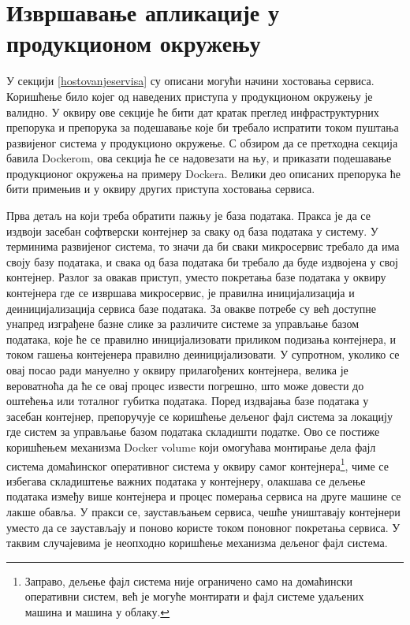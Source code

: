 \documentclass[12pt,oneside]{memoir}
\begin{document}
\section{Извршавање апликације у продукционом окружењу}
У секцији \ref{hostovanjeservisa} су описани могући начини хостовања сервиса. Коришћење било којег од наведених приступа у продукционом окружењу је валидно. У оквиру ове секције ће бити дат кратак преглед инфраструктурних препорука и препорука за подешавање које би требало испратити током пуштања развијеног система у продукционо окружење. С обзиром да се претходна секција бавила Dockerom, ова секција ће се надовезати на њу, и приказати подешавање продукционог окружења на примеру Dockera. Велики део описаних препорука ће бити примењив и у оквиру других приступа хостовања сервиса.

Прва детаљ на који треба обратити пажњу је база података. Пракса је да се издвоји засебан софтверски контејнер за сваку од база података у систему. У терминима развијеног система, то значи да би сваки микросервис требало да има своју базу података, и свака од база података би требало да буде издвојена у свој контејнер. Разлог за овакав приступ, уместо покретања базе података у оквиру контејнера где се извршава микросервис, је правилна иницијализација и деиницијализација сервиса базе података. За овакве потребе су већ доступне унапред изграђене базне слике за различите системе за управљање базом података, које ће се правилно иницијализовати приликом подизања контејнера, и током гашења контејенера правилно деиницијализовати. У супротном, уколико се овај посао ради мануелно у оквиру прилагођених контејнера, велика је вероватноћа да ће се овај процес извести погрешно, што може довести до оштећења или тоталног губитка података. Поред издвајања базе података у засебан контејнер, препоручује се коришћење дељеног фајл система за локацију где систем за управљање базом података складишти податке. Ово се постиже коришћењем механизма Docker volume \cite{dockervolume} који омогућава монтирање дела фајл система домаћинског оперативног система у оквиру самог контејнера\footnote{Заправо, дељење фајл система није ограничено само на домаћински оперативни систем, већ је могуће монтирати и фајл системе удаљених машина и машина у облаку.}, чиме се избегава складиштење важних података у контејнеру, олакшава се дељење података између више контејнера и процес померања сервиса на друге машине се лакше обавља. У пракси се, заустављањем сервиса, чешће уништавају контејнери уместо да се заустављају и поново користе током поновног покретања сервиса. У таквим случајевима је неопходно коришћење механизма дељеног фајл система.
\end{document}
